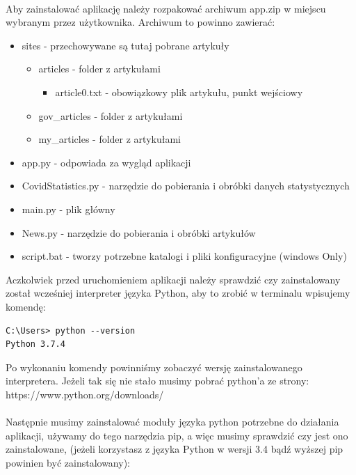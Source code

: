 \documentclass{article}
\begin{document}
\paragraph{}
Aby zainstalować aplikację należy rozpakować archiwum app.zip w miejscu wybranym przez użytkownika.
Archiwum to powinno zawierać:
\begin{itemize}
    \item sites - przechowywane są tutaj pobrane artykuły
    \begin{itemize}
        \item articles - folder z artykułami
        \begin{itemize}
            \item article0.txt - obowiązkowy plik artykułu, punkt wejściowy
        \end{itemize}
        \item gov\_articles - folder z artykułami
        \item my\_articles - folder z artykułami  
    \end{itemize}
    \item app.py - odpowiada za wygląd aplikacji
    \item CovidStatistics.py - narzędzie do pobierania i obróbki danych statystycznych
    \item main.py - plik główny
    \item News.py - narzędzie do pobierania i obróbki artykułów
    \item script.bat - tworzy potrzebne katalogi i pliki konfiguracyjne (windows Only)
\end{itemize}
Aczkolwiek przed uruchomieniem aplikacji należy sprawdzić czy zainstalowany został wcześniej interpreter języka Python, 
aby to zrobić w terminalu wpisujemy komendę:

\begin{verbatim}
C:\Users> python --version
Python 3.7.4
\end{verbatim}

Po wykonaniu komendy powinniśmy zobaczyć wersję zainstalowanego interpretera. Jeżeli tak się nie stało musimy pobrać python'a ze strony:\\
https://www.python.org/downloads/

\paragraph{}
Następnie musimy zainstalować moduły języka python potrzebne do działania aplikacji,
 używamy do tego narzędzia pip, a więc musimy sprawdzić czy jest ono zainstalowane, (jeżeli korzystasz z języka Python w wersji 3.4 bądź wyższej pip powinien być zainstalowany):
\end{document}
